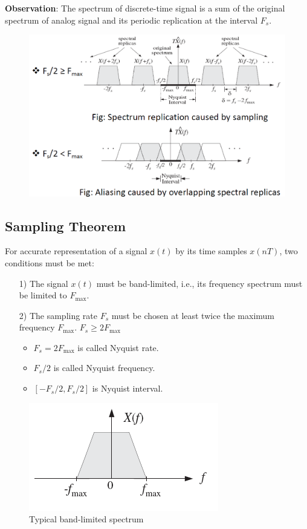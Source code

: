 \textbf{Observation}: The spectrum of discrete-time signal is a sum of the original spectrum of analog signal and its periodic replication at the interval $F_s$.
\begin{figure}[h!]
    \centering
    \includegraphics[width=0.7\linewidth]{img/6.png}
\end{figure}
\subsection{Sampling Theorem}
For accurate representation of a signal $x(t)$ by its time samples $x(nT)$, two conditions must be met:
\begin{itemize}
    \item[1)] The signal $x(t)$ must be band-limited, i.e., its frequency spectrum must be limited to $F_{\max}$.
    \item[2)] The sampling rate $F_s$ must be chosen at least twice the maximum frequency $F_{\max}$. $F_s \geq 2F_{\max}$
    \begin{itemize}
        \item $F_s=2F_{\max}$ is called Nyquist rate.
        \item $F_s/2$ is called Nyquist frequency.
        \item $[-F_s/2, F_s/2]$ is Nyquist interval.
    \end{itemize}
\end{itemize}
\begin{figure}[h!]
    \centering
    \includegraphics[width=0.3\linewidth]{img/7.png}
    \caption{Typical band-limited spectrum}
\end{figure}
